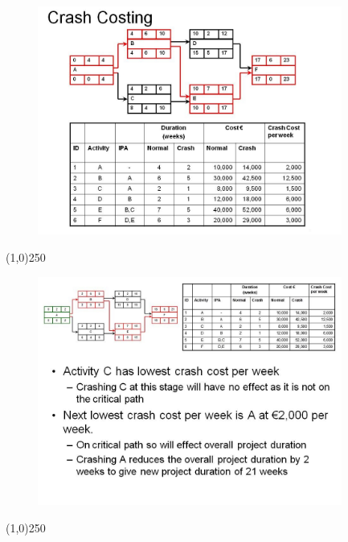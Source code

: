 \begin{frame}
\begin{figure}
	\centering
		\includegraphics[width = 10.0cm]{oldnotes/Slide356.jpg}
\end{figure}
\end{frame}
\begin{center}\line(1,0){250}\end{center}


\begin{frame}
\begin{figure}
	\centering
		\includegraphics[width = 10.0cm]{oldnotes/Slide357.jpg}
\end{figure}
\end{frame}
\begin{center}\line(1,0){250}\end{center}



